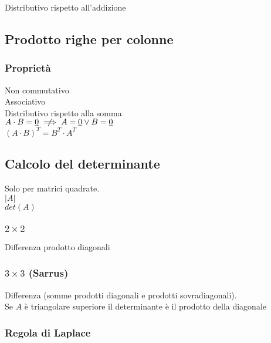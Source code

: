 \documentclass[a4paper, twoside, italian, 11pt]{book}
\begin{document}
Distributivo rispetto all'addizione


\subsection{Prodotto righe per colonne}


\subsubsection{Proprietà}

Non commutativo \\
Associativo \\
Distributivo rispetto alla somma \\

\noindent
$A \cdot B = \underline{0} \centernot\implies A = \underline{0} \lor B = \underline{0}$ \\

\noindent
$(A \cdot B)^T = B^T \cdot A^T$


\subsection{Calcolo del determinante}

Solo per matrici quadrate. \\

\noindent
$\left | A \right |$ \\

\noindent
$det(A)$


\subsubsection{$2 \times 2$}

Differenza prodotto diagonali


\subsubsection{$3 \times 3$ (Sarrus)}

Differenza (somme prodotti diagonali e prodotti sovradiagonali). \\

\noindent
Se $A$ è triangolare superiore il determinante è il prodotto della diagonale


\subsubsection{Regola di Laplace}
\end{document}
